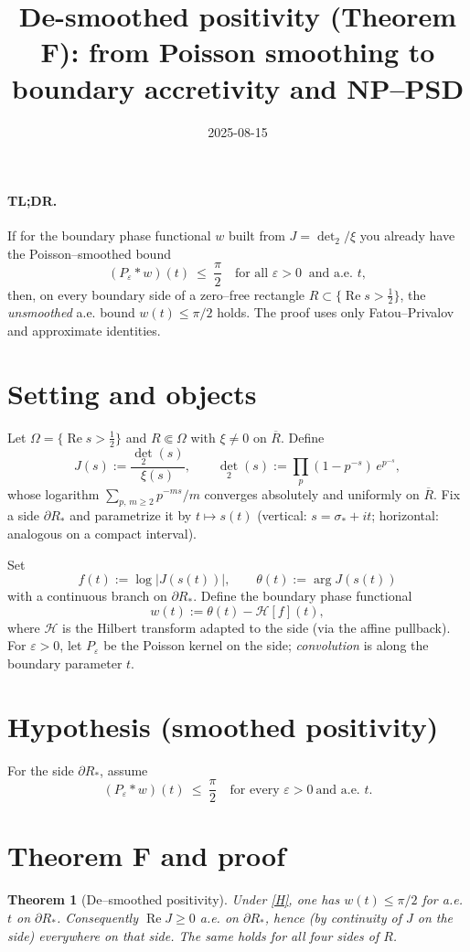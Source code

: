 \documentclass[11pt]{article}
\title{De-smoothed positivity (Theorem F): from Poisson smoothing to boundary accretivity and NP--PSD}
\date{2025-08-15}
\newtheorem{theorem}{Theorem}
\theoremstyle{remark}
\newcommand{\ReS}{\operatorname{Re}}
\begin{document}
\maketitle

\paragraph{TL;DR.} If for the boundary phase functional $w$ built from $J=\det_{2}/\xi$ you already have the Poisson--smoothed bound
\[
(P_\varepsilon * w)(t)\ \le\ \frac{\pi}{2} \quad \text{for all }\varepsilon>0\ \text{ and a.e. }t,
\]
then, on every boundary side of a zero--free rectangle $R\subset\{ \ReS s> \tfrac12\}$, the \emph{unsmoothed} a.e. bound $w(t)\le\pi/2$ holds. The proof uses only Fatou--Privalov and approximate identities.

\section*{Setting and objects}
Let $\Omega=\{\ReS s>\tfrac12\}$ and $R\Subset\Omega$ with $\xi\ne0$ on $\overline R$. Define
\[
J(s):=\frac{\det_2(s)}{\xi(s)},\qquad \det_2(s):=\prod_{p}(1-p^{-s})\,e^{p^{-s}},
\]
whose logarithm $\sum_{p,\,m\ge2} p^{-ms}/m$ converges absolutely and uniformly on $\overline R$. Fix a side $\partial R_*$ and parametrize it by $t\mapsto s(t)$ (vertical: $s=\sigma_*+it$; horizontal: analogous on a compact interval).

Set
\[
f(t):=\log|J(s(t))|,\qquad \theta(t):=\arg J(s(t))
\]
with a continuous branch on $\partial R_*$. Define the boundary phase functional
\[
w(t):=\theta(t)-\mathcal H[f](t),
\]
where $\mathcal H$ is the Hilbert transform adapted to the side (via the affine pullback). For $\varepsilon>0$, let $P_\varepsilon$ be the Poisson kernel on the side; \emph{convolution} is along the boundary parameter $t$.

\section*{Hypothesis (smoothed positivity)}
For the side $\partial R_*$, assume
\begin{equation}\label{H}
(P_\varepsilon * w)(t)\ \le\ \frac{\pi}{2}\quad \text{for every }\varepsilon>0\ \text{and a.e. }t.
\end{equation}

\section*{Theorem F and proof}
\begin{theorem}[De--smoothed positivity]\label{thm:F}
Under \eqref{H}, one has $w(t)\le\pi/2$ for a.e. $t$ on $\partial R_*$. Consequently $\ReS J\ge0$ a.e. on $\partial R_*$, hence (by continuity of $J$ on the side) everywhere on that side. The same holds for all four sides of $R$.
\end{theorem}
\end{document}
